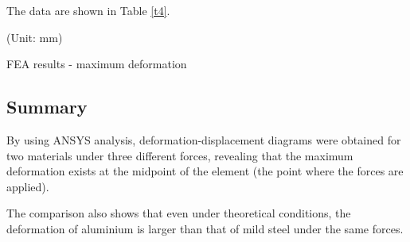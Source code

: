 The data are shown in Table \ref{t4}.

\begin{minipage}[htbp]{\textwidth}
    \makeatletter{}
    \centering
    
    (Unit: mm)
    \caption{FEA results - maximum deformation}
    \label{t4} 
\end{minipage}



\subsection*{Summary}
By using ANSYS analysis, deformation-displacement diagrams were obtained 
for two materials under three different forces, revealing that the maximum 
deformation exists at the midpoint of the element (the point where the forces are applied).

The comparison also shows that even under theoretical conditions, the deformation of aluminium is larger than that of mild steel under the same forces.
\fi